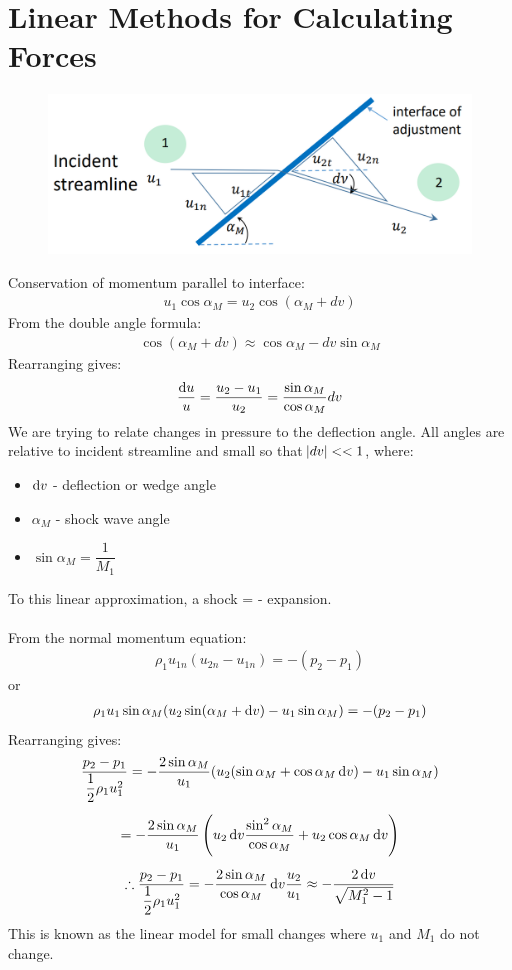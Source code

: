 \documentclass[class=report, crop=false, 12pt,a4paper]{standalone}
\begin{document}
\section{Linear Methods for Calculating Forces}
\begin{figure}[H]
    \centering
    \includegraphics[width = 0.85 \textwidth]{../img/diagram34.png}
    \caption{}
\end{figure}
Conservation of momentum parallel to interface: 
\begin{gather}
    u_1 \cos\alpha_M = u_2 \cos(\alpha_M + dv)
\end{gather}
From the double angle formula: 
\begin{gather}
    \cos(\alpha_M + dv) \approx \cos\alpha_M - dv\sin\alpha_M
\end{gather}
Rearranging gives: 
\begin{gather}
    \frac{\dif u}{u} = \frac{u_2-u_1}{u_2} = \frac{\sin\alpha_M}{\cos\alpha_M}dv
\end{gather}
We are trying to relate changes in pressure to the deflection angle.
All angles are relative to incident streamline and small so that $\abs{dv}<<1$, where: 
\begin{itemize}[noitemsep]
    \item $\dif v$ - deflection or wedge angle 
    \item $\alpha_M$ - shock wave angle 
    \item $\sin\alpha_M = \dfrac{1}{M_1}$
\end{itemize}
To this linear approximation, a shock = - expansion.
\\\\
From the normal momentum equation: 
\begin{gather}
    \rho_1 u_{1n} (u_{2n}-u_{1n}) = -(p_2-p_1) 
\end{gather}
or 
\begin{gather}
    \rho_1 u_1 \sin\alpha_M (u_2\sin(\alpha_M + \dif v)-u_1\sin\alpha_M) = -(p_2-p_1)
\end{gather}
Rearranging gives: 
\begin{gather}
    \frac{p_2-p_1}{\dfrac{1}{2}\rho_1 u_1^2} = -\frac{2\sin\alpha_M}{u_1}(u_2(\sin\alpha_M + \cos\alpha_M \dif v) - u_1\sin\alpha_M) \\[5pt]
    = -\frac{2\sin\alpha_M}{u_1} \left(u_2 \dif v \frac{\sin^2 \alpha_M}{\cos\alpha_M} + u_2\cos\alpha_M \dif v\right) \\[5pt]
    \therefore \frac{p_2-p_1}{\dfrac{1}{2}\rho_1 u_1^2} = -\frac{2\sin\alpha_M}{\cos \alpha_M} \dif v \frac{u_2}{u_1} \approx -\frac{2\dif v}{\sqrt{M_1^2-1}}
\end{gather}
This is known as the linear model for small changes where $u_1$ and $M_1$ do not change. 
\end{document}
